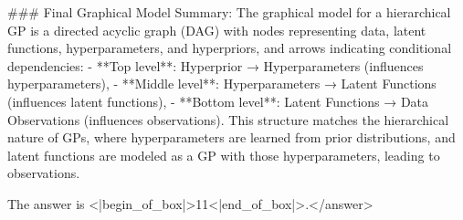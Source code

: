 ### Final Graphical Model Summary:  
The graphical model for a hierarchical GP is a directed acyclic graph (DAG) with nodes representing data, latent functions, hyperparameters, and hyperpriors, and arrows indicating conditional dependencies:  
- **Top level**: Hyperprior → Hyperparameters (influences hyperparameters),  
- **Middle level**: Hyperparameters → Latent Functions (influences latent functions),  
- **Bottom level**: Latent Functions → Data Observations (influences observations).  
This structure matches the hierarchical nature of GPs, where hyperparameters are learned from prior distributions, and latent functions are modeled as a GP with those hyperparameters, leading to observations.  

The answer is <|begin_of_box|>11<|end_of_box|>.</answer>